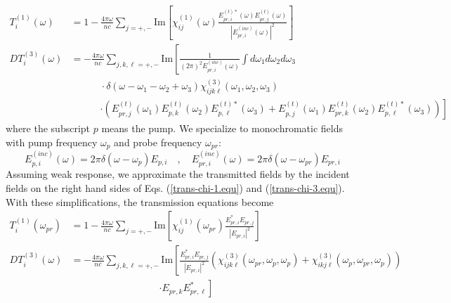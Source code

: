 \documentclass[aps,prb,superscriptaddress,letterpaper,amsmath,amssymb,twocolumn,preprintnumbers]{revtex4}
\begin{document}
\begin{widetext}
\begin{align}\label{trans-chi-1.equ}
T^{(1)}_{i}(\omega) &= 1 - \frac {4 \pi \omega} {n c} \sum_{j = +,-} \mathrm{Im} \left[ \chi^{(1)}_{i j} (\omega) \frac {E^{(t) \ast}_{pr , i}(\omega) E^{(t)}_{pr , j}(\omega)} {|E^{(inc)}_{pr , i}(\omega)|^2} \right] \\
DT^{(3)}_{i}(\omega) &= - \frac {4 \pi \omega} {n c} \sum_{j,k,\ell = +,-} \mathrm{Im} \left[ \frac{1} {( 2 \pi )^2 E^{(inc)}_{pr , i} (\omega)} \int d \omega_1 d \omega_2 d \omega_3
\right. \label{trans-chi-3.equ} \\
&\quad \quad \quad \cdot \delta(\omega-\omega_1-\omega_2+\omega_3) \chi^{(3)}_{i j k \ell} (\omega_1,\omega_2,\omega_3) \nonumber \\
&\quad \quad \quad \left. \cdot \left( E^{(t)}_{pr , j}(\omega_1) E^{(t)}_{p , k}(\omega_2) E^{(t) \ast}_{p , \ell}(\omega_3) + E^{(t)}_{p , j}(\omega_1) E^{(t)}_{pr , k}(\omega_2) E^{(t) \ast}_{p , \ell}(\omega_3) \right) \right] \nonumber
\end{align}
where the subscript $p$ means the pump. We specialize to monochromatic fields with pump frequency $\omega_p$ and probe frequency $\omega_{pr}$:
\begin{equation}
E^{(inc)}_{p , i}(\omega) = 2 \pi \delta (\omega - \omega_p) E_{p, i} \quad , \quad E^{(inc)}_{pr , i}(\omega) = 2 \pi \delta (\omega - \omega_{pr}) E_{pr, i}
\end{equation}
Assuming weak response, we approximate the transmitted fields by the incident fields on the right hand sides of Eqs. (\ref{trans-chi-1.equ}) and (\ref{trans-chi-3.equ}). With these simplifications, the transmission equations become
\begin{align}\label{trans-chi-1a.equ}
T^{(1)}_{i}(\omega_{pr}) &= 1 - \frac {4 \pi \omega} {n c} \sum_{j = +,-} \mathrm{Im} \left[ \chi^{(1)}_{i j} (\omega_{pr}) \frac {E^{\ast}_{pr , i} E^{}_{pr , j}} {|E^{}_{pr , i}|^2} \right] \\
DT^{(3)}_{i}(\omega) &= - \frac {4 \pi \omega} {n c} \sum_{j,k,\ell = +,-} \mathrm{Im} \left[ \frac {E^{\ast}_{pr , i} E^{}_{pr , j}} {|E^{}_{pr , i}|^2} \left( \chi^{(3)}_{i j k \ell} (\omega_{pr},\omega_{p},\omega_{p}) + \chi^{(3)}_{i k j \ell} (\omega_{p},\omega_{pr},\omega_{p}) \right)
\right. \nonumber \\
&\quad \quad \quad \quad \quad \quad \quad \quad \quad \left. \cdot E^{}_{pr , k} E^{\ast}_{pr , \ell} \right] \label{trans-chi-3a.equ}
\end{align}

\end{widetext}
\end{document}
